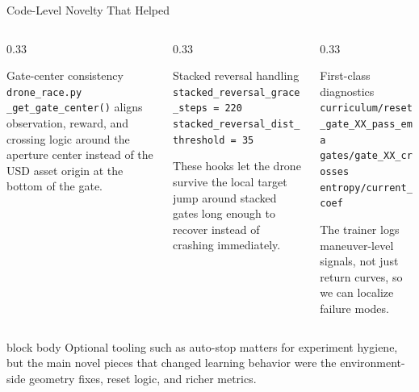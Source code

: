 \documentclass[aspectratio=169,10pt]{beamer}
\begin{document}
\begin{frame}{Code-Level Novelty That Helped}
  \begin{columns}[T,totalwidth=\textwidth]
    \begin{column}{0.33\textwidth}
      \begin{block}{Gate-center consistency}
        \scriptsize
        \texttt{drone\_race.py}\\[0.2em]
        \texttt{\_get\_gate\_center()} aligns observation, reward, and crossing logic around the aperture center instead of the USD asset origin at the bottom of the gate.
      \end{block}
    \end{column}
    \begin{column}{0.33\textwidth}
      \begin{block}{Stacked reversal handling}
        \scriptsize
        \texttt{stacked\_reversal\_grace\_steps = 220}\\
        \texttt{stacked\_reversal\_dist\_threshold = 35}

        These hooks let the drone survive the local target jump around stacked gates long enough to recover instead of crashing immediately.
      \end{block}
    \end{column}
    \begin{column}{0.33\textwidth}
      \begin{block}{First-class diagnostics}
        \scriptsize
        \texttt{curriculum/reset\_gate\_XX\_pass\_ema}\\
        \texttt{gates/gate\_XX\_crosses}\\
        \texttt{entropy/current\_coef}

        The trainer logs maneuver-level signals, not just return curves, so we can localize failure modes.
      \end{block}
    \end{column}
  \end{columns}
  \vspace{0.5em}
  \begin{beamercolorbox}[wd=\linewidth,sep=0.5ex,rounded=true]{block body}
    \small
    Optional tooling such as auto-stop matters for experiment hygiene, but the main novel pieces that changed learning behavior were the environment-side geometry fixes, reset logic, and richer metrics.
  \end{beamercolorbox}
\end{frame}
\end{document}

